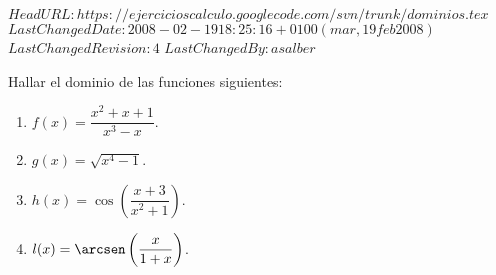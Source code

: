 \svnidlong
{$HeadURL: https://ejercicioscalculo.googlecode.com/svn/trunk/dominios.tex $}
{$LastChangedDate: 2008-02-19 18:25:16 +0100 (mar, 19 feb 2008) $}
{$LastChangedRevision: 4 $}
{$LastChangedBy: asalber $}
%
{Hallar el dominio de las funciones siguientes:
\begin{multicols}{2}
\begin{enumerate}
  \item $f(x)=\dfrac{x^2+x+1}{x^3-x}$.

  \item $g(x)=\sqrt{x^4-1}$.

  \item $h(x)=\cos\left(\dfrac{x+3}{x^2+1}\right)$.

   \item $l(x)=\arcsen\left(\dfrac{x}{1+x}\right)$.
\end{enumerate}
\end{multicols}
}
